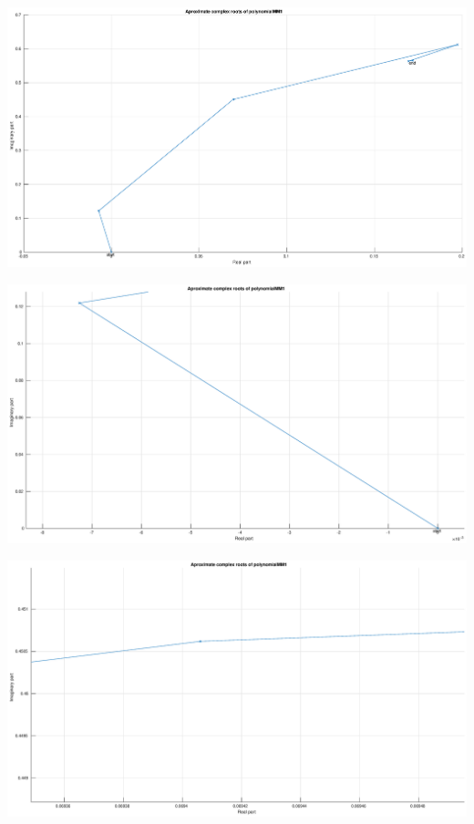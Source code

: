 \documentclass[12pt]{report}
\begin{document}
\begin{center}
   \includegraphics[scale=0.25]{task2mm1complexoverall.eps}
\end{center}

\begin{center}
   \includegraphics[scale=0.25]{task2mm1complexdown.eps}
\end{center}

\begin{center}
   \includegraphics[scale=0.25]{task2mm1complexmiddle.eps}
\end{center}
\end{document}
